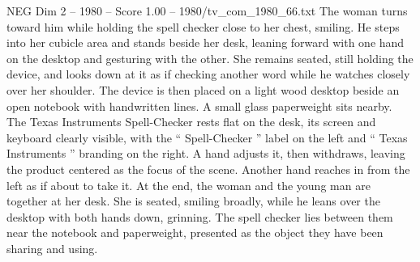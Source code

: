 \begin{textsample}{NEG Dim 2 – 1980 – Score 1.00 – 1980/tv\_com\_1980\_66.txt}
The woman turns toward him while holding the spell checker close to her chest, smiling.
He steps into her cubicle area and stands beside her desk, leaning forward with one hand on the desktop and gesturing with the other.
She remains seated, still holding the device, and looks down at it as if checking another word while he watches closely over her shoulder.
The device is then placed on a light wood desktop beside an open notebook with handwritten lines.
A small glass paperweight sits nearby.
The Texas Instruments Spell-Checker rests flat on the desk, its screen and keyboard clearly visible, with the “ Spell-Checker ” label on the left and “ Texas Instruments ” branding on the right.
A hand adjusts it, then withdraws, leaving the product centered as the focus of the scene.
Another hand reaches in from the left as if about to take it.
At the end, the woman and the young man are together at her desk.
She is seated, smiling broadly, while he leans over the desktop with both hands down, grinning.
The spell checker lies between them near the notebook and paperweight, presented as the object they have been sharing and using.

\end{textsample}
